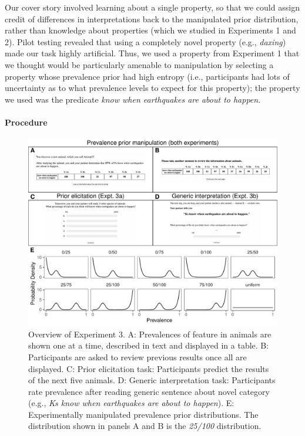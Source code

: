 \documentclass[floatsintext,doc]{apa6}
\let\oldparagraph\paragraph
\renewcommand{\paragraph}[1]{\oldparagraph{#1}\mbox{}}
\newcommand{\mht}[1]{{\textcolor{Blue}{[mht: #1]}}}
\begin{document}
Our cover story involved learning about a single property, so that we could assign credit of differences in interpretations back to the manipulated prior distribution, rather than knowledge about properties (which we studied in Experiments 1 and 2). 
Pilot testing revealed that using a completely novel property (e.g., \emph{daxing}) made our task highly artificial. 
Thus, we used a property from Experiment 1 that we thought would be particularly amenable to manipulation by selecting a property whose prevalence prior had high entropy (i.e., participants had lots of uncertainty as to what prevalence levels to expect for this property); the property we used was the predicate \emph{know when earthquakes are about to happen}.

\hypertarget{procedure}{%
\paragraph{Procedure}\label{procedure}}
%
\begin{figure}
\centering
\includegraphics{figs/expt2-overview.pdf}
\caption{\label{fig:priorManipulationExpt}Overview of Experiment 3. A: Prevalences of feature in animals are shown one at a time, described in text and displayed in a table. B: Participants are asked to review previous results once all are displayed. C: Prior elicitation task: Participants predict the results of the next five animals. D: Generic interpretation task: Participants rate prevalence after reading generic sentence about novel category (e.g., \emph{Ks know when earthquakes are about to happen}). E: Experimentally manipulated prevalence prior distributions. The distribution shown in panels A and B is the \emph{25/100} distribution.}
\end{figure}
\end{document}
